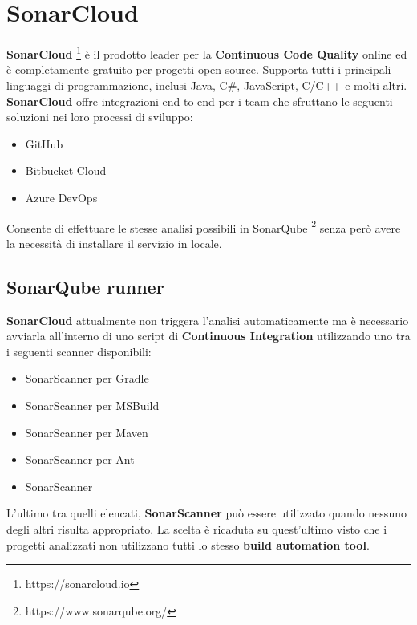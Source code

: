 \section{SonarCloud}\label{sonar}
\textbf{SonarCloud} \footnote{https://sonarcloud.io} è il prodotto leader per la \textbf{Continuous Code Quality} online ed è completamente gratuito per progetti open-source. Supporta tutti i principali linguaggi di programmazione, inclusi Java, C\#, JavaScript, C/C++ e molti altri. \textbf{SonarCloud} offre integrazioni end-to-end per i team che sfruttano le seguenti soluzioni nei loro processi di sviluppo:
\begin{itemize}
	\item GitHub
	\item Bitbucket Cloud
	\item Azure DevOps
\end{itemize}
Consente di effettuare le stesse analisi possibili in SonarQube \footnote{https://www.sonarqube.org/} senza però avere la necessità di installare il servizio in locale.
\subsection{SonarQube runner}
\textbf{SonarCloud} attualmente non triggera l'analisi automaticamente ma è necessario avviarla all'interno di uno script di \textbf{Continuous Integration} utilizzando uno tra i seguenti scanner disponibili:
\begin{itemize}
	\item SonarScanner per Gradle
	\item SonarScanner per MSBuild
	\item SonarScanner per Maven
	\item SonarScanner per Ant
	\item SonarScanner	
\end{itemize}
L'ultimo tra quelli elencati, \textbf{SonarScanner} può essere utilizzato quando nessuno degli altri risulta appropriato. La scelta è ricaduta su quest'ultimo visto che i progetti analizzati non utilizzano tutti lo stesso \textbf{build automation tool}. 
